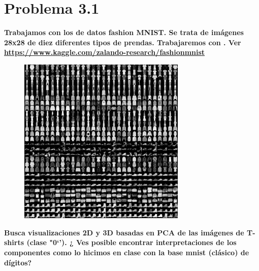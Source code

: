 \section*{Problema 3.1}

\textbf{Trabajamos con los de datos fashion MNIST. Se trata de imágenes 28x28 de diez diferentes tipos de prendas. Trabajaremos con .  Ver \url{https://www.kaggle.com/zalando-research/fashionmnist}}

\begin{figure}[H]
    \centering
    \includegraphics[width=8cm]{Graphics/Problema_3_1.png}
    \caption{}
\end{figure}

\textbf{Busca visualizaciones 2D y 3D basadas en PCA de las imágenes de T-shirts (clase "0`'). ¿ Ves posible encontrar interpretaciones de los componentes como lo hicimos en clase con la base mnist (clásico) de dígitos?}